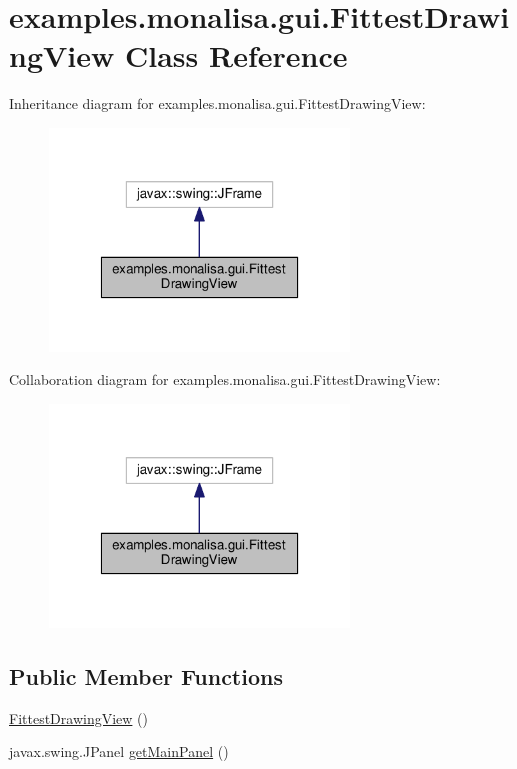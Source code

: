 \hypertarget{classexamples_1_1monalisa_1_1gui_1_1_fittest_drawing_view}{\section{examples.\-monalisa.\-gui.\-Fittest\-Drawing\-View Class Reference}
\label{classexamples_1_1monalisa_1_1gui_1_1_fittest_drawing_view}
}


Inheritance diagram for examples.\-monalisa.\-gui.\-Fittest\-Drawing\-View\-:
\nopagebreak
\begin{figure}[H]
\begin{center}
\leavevmode
\includegraphics[width=226pt]{classexamples_1_1monalisa_1_1gui_1_1_fittest_drawing_view__inherit__graph}
\end{center}
\end{figure}


Collaboration diagram for examples.\-monalisa.\-gui.\-Fittest\-Drawing\-View\-:
\nopagebreak
\begin{figure}[H]
\begin{center}
\leavevmode
\includegraphics[width=226pt]{classexamples_1_1monalisa_1_1gui_1_1_fittest_drawing_view__coll__graph}
\end{center}
\end{figure}
\subsection*{Public Member Functions}
\begin{DoxyCompactItemize}
\item 
\hyperlink{classexamples_1_1monalisa_1_1gui_1_1_fittest_drawing_view_acb2207142c3720b708fddc2b36b36715}{Fittest\-Drawing\-View} ()
\item 
javax.\-swing.\-J\-Panel \hyperlink{classexamples_1_1monalisa_1_1gui_1_1_fittest_drawing_view_a1d2eeeaa67a2fe52e0a43e53f5137d33}{get\-Main\-Panel} ()
\end{DoxyCompactItemize}
